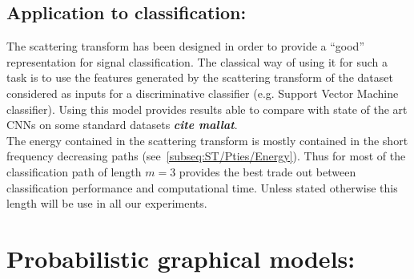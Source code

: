 \documentclass[a4paper,11pt]{report}
\begin{document}
{      
      
% 		
 
		
  \section{Application to classification:}
    \label{seq:ST/Applications to clf}
    
    The scattering transform has been designed in order to provide a ``good'' representation for signal classification. The classical way of using it for such a task is to use the features generated by the scattering transform of the dataset considered as inputs for a discriminative classifier (e.g. Support Vector Machine classifier). Using this model provides results able to compare with state of the art CNNs on some standard datasets \textbf{\textit{cite mallat}}. \\
    
    The energy contained in the scattering transform is mostly contained in the short frequency decreasing paths (see~\ref{subseq:ST/Pties/Energy}). Thus for most of the classification path of length $m=3$ provides the best trade out between classification performance and computational time. Unless stated otherwise this length will be use in all our experiments.
    
    
\chapter{Probabilistic graphical models:}
  \label{chap:PGMs}
  
}
\end{document}
